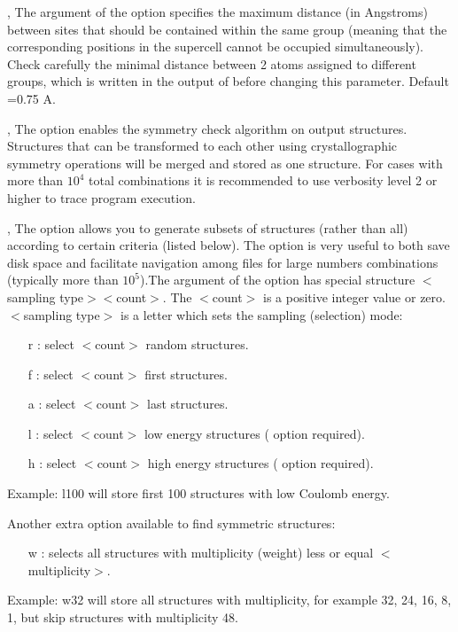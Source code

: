 \documentclass[a4paper,english]{article}
\begin{document}
\begin{Description}
\item[\oOptArg{-t }{tolerance}, \oOptArg{\Dd tolerance=}{tolerance}]
      The argument of the option specifies the maximum distance (in Angstroms) between sites that should be contained within the same group (meaning that the corresponding positions in the supercell cannot be occupied simultaneously). Check carefully the minimal distance between 2 atoms assigned to different groups, which is written in the output of  before changing this parameter. Default =0.75 A.

\item[\oOpt{-m}, \oOpt{\Dd merge-symmetric}]
      The option enables the symmetry check algorithm on output structures. Structures that can be transformed to each other using crystallographic symmetry operations will be merged and stored as one structure. For cases with more than $10^4$ total combinations it is recommended to use verbosity level 2 or higher to trace program execution.
      
\item[\oOptArg{-n }{selection}, \oOptArg{\Dd store-structures=}{selection}]
      The option allows you to generate subsets of structures (rather than all) according to certain criteria (listed below). The option is very useful to both save disk space and facilitate navigation among files for large numbers combinations (typically more than $10^5$).The argument of the option has special structure $<$sampling type$><$count$>$. The $<$count$>$ is a positive integer value or zero. $<$sampling type$>$ is a letter which sets the sampling (selection) mode:
      \begin{itemize}
        \item[r]: select $<$count$>$ random structures.
        \item[f]: select $<$count$>$ first structures.
        \item[a]: select $<$count$>$ last structures.
        \item[l]: select $<$count$>$ low energy structures ( option required).
        \item[h]: select $<$count$>$ high energy structures ( option required).
      \end{itemize}
      Example: l100 will store first 100 structures with low Coulomb energy.
      
      Another extra option available to find symmetric structures:
      \begin{itemize}
        \item[w]: selects all structures with multiplicity (weight) less or equal $<$multiplicity$>$.
      \end{itemize}      
      Example: w32 will store all structures with multiplicity, for example 32, 24, 16, 8, 1, but skip structures with multiplicity 48.
      

\end{Description}
\end{document}

